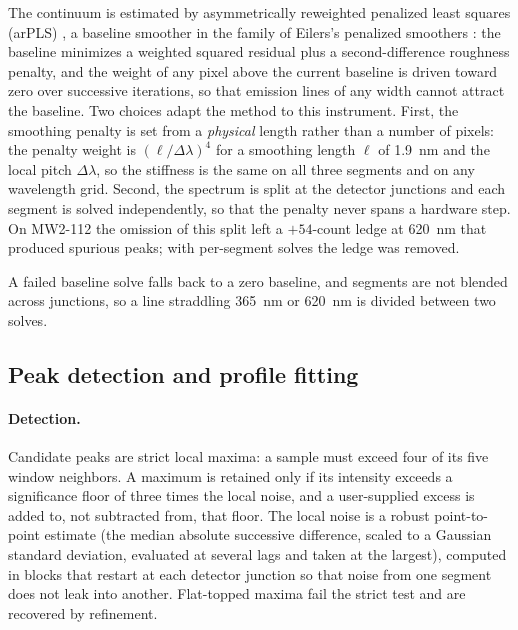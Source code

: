 The continuum is estimated by asymmetrically reweighted penalized least squares
(arPLS) \citep{baek2015arpls}, a baseline smoother in the family of
Eilers's penalized smoothers \citep{eilers2003smoother}: the baseline minimizes a weighted squared residual plus a
second-difference roughness penalty, and the weight of any pixel above the current
baseline is driven toward zero over successive iterations, so that emission lines of any
width cannot attract the baseline.
Two choices adapt the method to this instrument.
First, the smoothing penalty is set from a \emph{physical} length rather than a number of
pixels: the penalty weight is $(\ell/\Delta\lambda)^4$ for a smoothing length $\ell$ of
\SI{1.9}{nm} and the local pitch $\Delta\lambda$, so the stiffness is the same on all three
segments and on any wavelength grid.
Second, the spectrum is split at the detector junctions and each segment is solved
independently, so that the penalty never spans a hardware step.
On MW2-112 the omission of this split left a $+54$-count ledge at \SI{620}{nm} that
produced spurious peaks; with per-segment solves the ledge was removed.

A failed baseline solve falls back to a zero baseline, and segments are not blended across junctions, so a line straddling \SI{365}{nm} or \SI{620}{nm} is divided between two solves.

\subsection{Peak detection and profile fitting}
\label{sec:wf-fit}

\paragraph{Detection.}
Candidate peaks are strict local maxima: a sample must exceed four of its five window
neighbors.
A maximum is retained only if its intensity exceeds a significance floor of three times
the local noise, and a user-supplied excess is added to, not subtracted from, that floor.
The local noise is a robust point-to-point estimate (the median absolute successive
difference, scaled to a Gaussian standard deviation, evaluated at several lags and taken at
the largest), computed in blocks that restart at each detector junction so that noise from
one segment does not leak into another.
Flat-topped maxima fail the strict test and are recovered by refinement.

